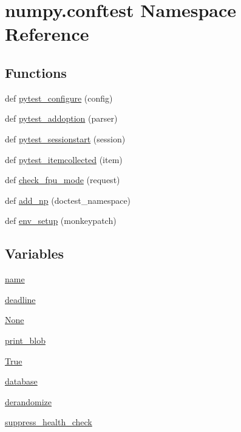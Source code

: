 \hypertarget{namespacenumpy_1_1conftest}{}\section{numpy.\+conftest Namespace Reference}
\label{namespacenumpy_1_1conftest}
\subsection*{Functions}
\begin{DoxyCompactItemize}
\item 
def \hyperlink{namespacenumpy_1_1conftest_ac4b696c41637478fc584c75be6e90fe9}{pytest\+\_\+configure} (config)
\item 
def \hyperlink{namespacenumpy_1_1conftest_a8c2c8bdc8f5f911b1fc64c968cee84e7}{pytest\+\_\+addoption} (parser)
\item 
def \hyperlink{namespacenumpy_1_1conftest_a487489337ad4298f7d3e3fdd338d98e4}{pytest\+\_\+sessionstart} (session)
\item 
def \hyperlink{namespacenumpy_1_1conftest_a3ba4ebdc896e0f5cf294373ff6c47171}{pytest\+\_\+itemcollected} (item)
\item 
def \hyperlink{namespacenumpy_1_1conftest_abb3c8c424f98ed8e38dc510c5ed7aaef}{check\+\_\+fpu\+\_\+mode} (request)
\item 
def \hyperlink{namespacenumpy_1_1conftest_a31e24c9751fbd702394941a8151bbe65}{add\+\_\+np} (doctest\+\_\+namespace)
\item 
def \hyperlink{namespacenumpy_1_1conftest_a99b17d9fba18dff1cb7e67fea1a65ce0}{env\+\_\+setup} (monkeypatch)
\end{DoxyCompactItemize}
\subsection*{Variables}
\begin{DoxyCompactItemize}
\item 
\hyperlink{namespacenumpy_1_1conftest_af5b83565ad7d4531ea7a9b251e0cd92c}{name}
\item 
\hyperlink{namespacenumpy_1_1conftest_ab031d7b1440ed99a37efc8be365cbf07}{deadline}
\item 
\hyperlink{namespacenumpy_1_1conftest_a5125129ef28f1d7c7976838380c20e3b}{None}
\item 
\hyperlink{namespacenumpy_1_1conftest_aa115b535dfffad2aa5794177f5570aef}{print\+\_\+blob}
\item 
\hyperlink{namespacenumpy_1_1conftest_a0b6dcae7a96ebacdd33900a73acca07c}{True}
\item 
\hyperlink{namespacenumpy_1_1conftest_a79a25c7ddab5fe79ef8015a7f6fc821a}{database}
\item 
\hyperlink{namespacenumpy_1_1conftest_a0080594961e8392a2fa43761067078e6}{derandomize}
\item 
\hyperlink{namespacenumpy_1_1conftest_a1c903e4fa4915a6b9c7419b77efd2f68}{suppress\+\_\+health\+\_\+check}
\end{DoxyCompactItemize}


